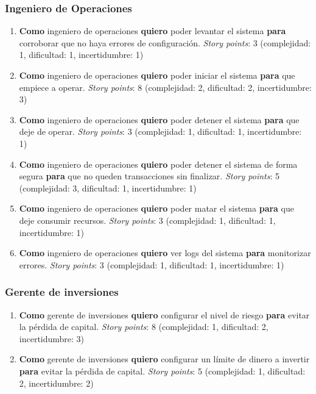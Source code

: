 \documentclass[
    11pt, %
]{charter}
\begin{document}
    \subsubsection{Ingeniero de Operaciones}
    \begin{enumerate}
    \item \textbf{Como} ingeniero de operaciones \textbf{quiero} poder levantar el sistema \textbf{para} corroborar que no haya errores de configuración.
      \textit{Story points}: 3  (complejidad: 1, dificultad: 1, incertidumbre: 1)
    \item \textbf{Como} ingeniero de operaciones \textbf{quiero} poder iniciar el sistema \textbf{para} que empiece a operar.
      \textit{Story points}: 8  (complejidad: 2, dificultad: 2, incertidumbre: 3)
    \item \textbf{Como} ingeniero de operaciones \textbf{quiero} poder detener el sistema \textbf{para} que deje de operar.
      \textit{Story points}: 3  (complejidad: 1, dificultad: 1, incertidumbre: 1)
    \item \textbf{Como} ingeniero de operaciones \textbf{quiero} poder detener el sistema de forma segura \textbf{para} que no queden transacciones sin finalizar.
      \textit{Story points}: 5  (complejidad: 3, dificultad: 1, incertidumbre: 1)
    \item \textbf{Como} ingeniero de operaciones \textbf{quiero} poder matar el sistema \textbf{para} que deje consumir recursos.
      \textit{Story points}: 3  (complejidad: 1, dificultad: 1, incertidumbre: 1)
    \item \textbf{Como} ingeniero de operaciones \textbf{quiero} ver logs del sistema  \textbf{para} monitorizar errores.
      \textit{Story points}: 3  (complejidad: 1, dificultad: 1, incertidumbre: 1)
    \end{enumerate}


    \subsubsection{Gerente de inversiones}
    \begin{enumerate}
    \item \textbf{Como} gerente de inversiones  \textbf{quiero} configurar el nivel de riesgo \textbf{para} evitar la pérdida de capital.
      \textit{Story points}: 8  (complejidad: 1, dificultad: 2, incertidumbre: 3)
    \item \textbf{Como} gerente de inversiones \textbf{quiero} configurar un límite de dinero a invertir \textbf{para} evitar la pérdida de capital.
      \textit{Story points}: 5  (complejidad: 1, dificultad: 2, incertidumbre: 2)
    \end{enumerate}
\end{document}
